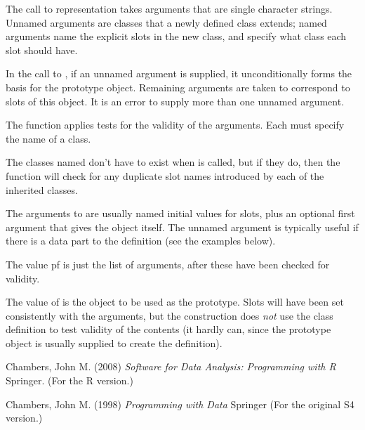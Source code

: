 %
\begin{Arguments}
\begin{ldescription}
\item[\code{...}] 
The call to representation takes arguments that are single character
strings.  Unnamed arguments are classes that a newly defined class
extends; named arguments name the explicit slots in the new class,
and specify what class each slot should have.

In the call to , if an unnamed argument is
supplied, it unconditionally forms the basis for the prototype
object.  Remaining arguments are taken to correspond to slots of
this object.  It is an error to supply more than one unnamed argument.

\end{ldescription}
\end{Arguments}
%
\begin{Details}\relax
The  function applies tests for the validity of
the arguments.  Each must specify the name of a class.

The classes named don't have to exist when  is
called, but if they do, then the function will check for any duplicate
slot names introduced by each of the inherited classes.

The arguments to  are usually named initial values
for slots, plus an optional first argument that gives the object
itself.  The unnamed argument is typically useful if there is a data
part to the definition (see the examples below).
\end{Details}
%
\begin{Value}
The value pf   is just the list of arguments, after these have been checked
for validity.

The value of  is the object to be used as the
prototype.  Slots will have been set consistently with the
arguments, but the construction does \emph{not} use the class
definition to test validity of the contents (it hardly can, since
the prototype object is usually supplied to create the definition).
\end{Value}
%
\begin{References}\relax
Chambers, John M. (2008)
\emph{Software for Data Analysis: Programming with R}
Springer.  (For the R version.)

Chambers, John M. (1998)
\emph{Programming with Data}
Springer (For the original S4 version.)
\end{References}
